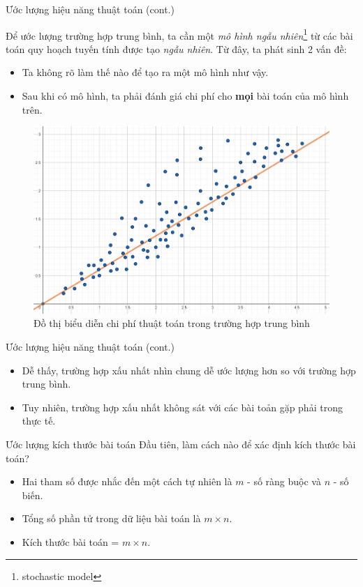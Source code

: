 \documentclass[10pt]{beamer}
\begin{document}
\begin{frame}{Ước lượng hiệu năng thuật toán (cont.)}
\begin{multicols}{2}
Để ước lượng  trường hợp trung bình, ta cần một \textit{mô hình ngẫu nhiên}\footnote{stochastic model} từ các bài toán quy hoạch tuyến tính được tạo \textit{ngẫu nhiên}. Từ đây, ta phát sinh 2 vấn đề:
\begin{itemize}
\item Ta không rõ làm thế nào để tạo ra một mô hình như vậy.
\item Sau khi có mô hình, ta phải đánh giá chi phí cho \textbf{mọi} bài toán của mô hình trên.
\end{itemize}
\columnbreak
\begin{figure}
\centering
\includegraphics[width=\linewidth]{img/average-case.png}
\caption{Đồ thị biểu diễn chi phí thuật toán trong trường hợp trung bình}
\end{figure}
\end{multicols}
\end{frame}

\begin{frame}{Ước lượng hiệu năng thuật toán (cont.)}
\begin{itemize}
\item Dễ thấy, trường hợp xấu nhất nhìn chung dễ ước lượng hơn so với trường hợp trung bình.
\item Tuy nhiên, trường hợp xấu nhất không sát với các bài toản gặp phải trong thực tế.
\end{itemize}
\end{frame}

\begin{frame}{Ước lượng kích thước bài toán}
Đầu tiên, làm cách nào để xác định kích thước bài toán?\\
\begin{itemize}
\item Hai tham số được nhắc đến một cách tự nhiên là $m$ - số ràng buộc và $n$ - số biến.
\item Tổng số phần tử trong dữ liệu bài toán là $m\times n$.
\item Kích thước bài toán = $m\times n$.
\end{itemize}
\end{frame}
\end{document}
